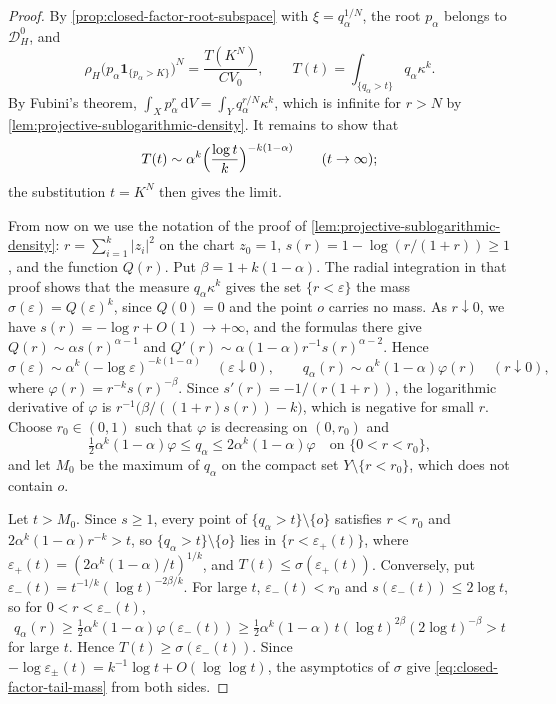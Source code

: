 \begin{proof}
By \cref{prop:closed-factor-root-subspace} with $\xi=q_\alpha^{1/N}$, the root $p_\alpha$ belongs to $\mathcal D_H^0$, and
\[
 \rho_H\bigl(p_\alpha\mathbf1_{\{p_\alpha>K\}}\bigr)^N=\frac{T(K^N)}{CV_0},
 \qquad
 T(t)=\int_{\{q_\alpha>t\}}q_\alpha\kappa^k.
\]
By Fubini's theorem, $\int_Xp_\alpha^r\,\mathrm{d}V=\int_Yq_\alpha^{r/N}\kappa^k$, which is infinite for $r>N$ by \cref{lem:projective-sublogarithmic-density}. It remains to show that
\begin{equation}\label{eq:closed-factor-tail-mass}
 T(t)\sim\alpha^k\Bigl(\frac{\log t}{k}\Bigr)^{-k(1-\alpha)}\qquad(t\to\infty);
\end{equation}
the substitution $t=K^N$ then gives the limit.

From now on we use the notation of the proof of \cref{lem:projective-sublogarithmic-density}: $r=\sum_{i=1}^k|z_i|^2$ on the chart $z_0=1$, $s(r)=1-\log(r/(1+r))\geq1$, and the function $Q(r)$. Put $\beta=1+k(1-\alpha)$. The radial integration in that proof shows that the measure $q_\alpha\kappa^k$ gives the set $\{r<\varepsilon\}$ the mass $\sigma(\varepsilon)=Q(\varepsilon)^k$, since $Q(0)=0$ and the point $o$ carries no mass. As $r\downarrow0$, we have $s(r)=-\log r+O(1)\to+\infty$, and the formulas there give $Q(r)\sim\alpha s(r)^{\alpha-1}$ and $Q'(r)\sim\alpha(1-\alpha)r^{-1}s(r)^{\alpha-2}$. Hence
\[
 \sigma(\varepsilon)\sim\alpha^k(-\log\varepsilon)^{-k(1-\alpha)}\quad(\varepsilon\downarrow0),
 \qquad
 q_\alpha(r)\sim\alpha^k(1-\alpha)\varphi(r)\quad(r\downarrow0),
\]
where $\varphi(r)=r^{-k}s(r)^{-\beta}$. Since $s'(r)=-1/(r(1+r))$, the logarithmic derivative of $\varphi$ is $r^{-1}\bigl(\beta/((1+r)s(r))-k\bigr)$, which is negative for small $r$. Choose $r_0\in(0,1)$ such that $\varphi$ is decreasing on $(0,r_0)$ and
\[
 \tfrac12\alpha^k(1-\alpha)\varphi\leq q_\alpha\leq2\alpha^k(1-\alpha)\varphi
 \quad\text{on }\{0<r<r_0\},
\]
and let $M_0$ be the maximum of $q_\alpha$ on the compact set $Y\setminus\{r<r_0\}$, which does not contain $o$.

Let $t>M_0$. Since $s\geq1$, every point of $\{q_\alpha>t\}\setminus\{o\}$ satisfies $r<r_0$ and $2\alpha^k(1-\alpha)r^{-k}>t$, so $\{q_\alpha>t\}\setminus\{o\}$ lies in $\{r<\varepsilon_+(t)\}$, where $\varepsilon_+(t)=(2\alpha^k(1-\alpha)/t)^{1/k}$, and $T(t)\leq\sigma(\varepsilon_+(t))$. Conversely, put $\varepsilon_-(t)=t^{-1/k}(\log t)^{-2\beta/k}$. For large $t$, $\varepsilon_-(t)<r_0$ and $s(\varepsilon_-(t))\leq2\log t$, so for $0<r<\varepsilon_-(t)$,
\[
 q_\alpha(r)\geq\tfrac12\alpha^k(1-\alpha)\varphi(\varepsilon_-(t))
 \geq\tfrac12\alpha^k(1-\alpha)\,t(\log t)^{2\beta}(2\log t)^{-\beta}>t
\]
for large $t$. Hence $T(t)\geq\sigma(\varepsilon_-(t))$. Since $-\log\varepsilon_\pm(t)=k^{-1}\log t+O(\log\log t)$, the asymptotics of $\sigma$ give \eqref{eq:closed-factor-tail-mass} from both sides.
\end{proof}

